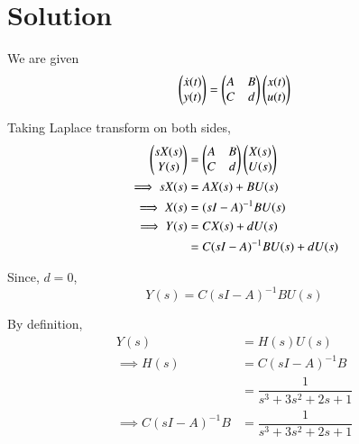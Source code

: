 \documentclass[journal,12pt,twocolumn]{IEEEtran}
\begin{document}
\section{Solution}

We are given 
\begin{equation}
    \begin{pmatrix}\dot{x}(t)\\y(t)\end{pmatrix} = \begin{pmatrix}A & B\\C & d\end{pmatrix}\begin{pmatrix}x(t)\\u(t)\end{pmatrix}
\end{equation}
    
Taking Laplace transform on both sides,
\begin{align}
    \begin{pmatrix}sX(s)\\Y(s)\end{pmatrix} &= \begin{pmatrix}A & B\\ C & d\end{pmatrix}\begin{pmatrix}X(s)\\U(s)\end{pmatrix}\\
    \implies sX(s) &= AX(s)+BU(s)\\
    \implies X(s) &= (sI-A)^{-1} BU(s)\\
    \implies Y(s) &= CX(s)+dU(s)\\ 
                  &= C(sI-A)^{-1} BU(s) +dU(s)
\end{align}

Since, $d = 0$, 
\begin{equation}
    Y(s) = C(sI-A)^{-1} BU(s)
\end{equation}

By definition, 
\begin{align}
    Y(s) &= H(s)U(s)\\
    \implies H(s) &= C(sI-A)^{-1} B\\
                  &= \dfrac{1}{s^3+3s^2+2s+1}\\
    \implies C(sI-A)^{-1} B &= \dfrac{1}{s^3+3s^2+2s+1}\label{result}
\end{align} 
\end{document}
